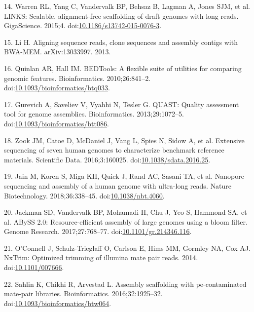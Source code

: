 \documentclass{bmcart}
\begin{document}
\begin{backmatter}
\leavevmode\hypertarget{ref-Warren_2015}{}%
14. Warren RL, Yang C, Vandervalk BP, Behsaz B, Lagman A, Jones SJM, et al. LINKS: Scalable, alignment-free scaffolding of draft genomes with long reads. GigaScience. 2015;4. doi:\href{https://doi.org/10.1186/s13742-015-0076-3}{10.1186/s13742-015-0076-3}.

\leavevmode\hypertarget{ref-Li_2013}{}%
15. Li H. Aligning sequence reads, clone sequences and assembly contigs with BWA-MEM. arXiv:13033997. 2013.

\leavevmode\hypertarget{ref-Quinlan_2010}{}%
16. Quinlan AR, Hall IM. BEDTools: A flexible suite of utilities for comparing genomic features. Bioinformatics. 2010;26:841--2. doi:\href{https://doi.org/10.1093/bioinformatics/btq033}{10.1093/bioinformatics/btq033}.

\leavevmode\hypertarget{ref-Gurevich_2013}{}%
17. Gurevich A, Saveliev V, Vyahhi N, Tesler G. QUAST: Quality assessment tool for genome assemblies. Bioinformatics. 2013;29:1072--5. doi:\href{https://doi.org/10.1093/bioinformatics/btt086}{10.1093/bioinformatics/btt086}.

\leavevmode\hypertarget{ref-Zook_2016}{}%
18. Zook JM, Catoe D, McDaniel J, Vang L, Spies N, Sidow A, et al. Extensive sequencing of seven human genomes to characterize benchmark reference materials. Scientific Data. 2016;3:160025. doi:\href{https://doi.org/10.1038/sdata.2016.25}{10.1038/sdata.2016.25}.

\leavevmode\hypertarget{ref-Jain_2018}{}%
19. Jain M, Koren S, Miga KH, Quick J, Rand AC, Sasani TA, et al. Nanopore sequencing and assembly of a human genome with ultra-long reads. Nature Biotechnology. 2018;36:338--45. doi:\href{https://doi.org/10.1038/nbt.4060}{10.1038/nbt.4060}.

\leavevmode\hypertarget{ref-Jackman_2017}{}%
20. Jackman SD, Vandervalk BP, Mohamadi H, Chu J, Yeo S, Hammond SA, et al. ABySS 2.0: Resource-efficient assembly of large genomes using a bloom filter. Genome Research. 2017;27:768--77. doi:\href{https://doi.org/10.1101/gr.214346.116}{10.1101/gr.214346.116}.

\leavevmode\hypertarget{ref-O_Connell_2014}{}%
21. O'Connell J, Schulz-Trieglaff O, Carlson E, Hims MM, Gormley NA, Cox AJ. NxTrim: Optimized trimming of illumina mate pair reads. 2014. doi:\href{https://doi.org/10.1101/007666}{10.1101/007666}.

\leavevmode\hypertarget{ref-Sahlin_2016}{}%
22. Sahlin K, Chikhi R, Arvestad L. Assembly scaffolding with pe-contaminated mate-pair libraries. Bioinformatics. 2016;32:1925--32. doi:\href{https://doi.org/10.1093/bioinformatics/btw064}{10.1093/bioinformatics/btw064}.


\end{backmatter}
\end{document}
